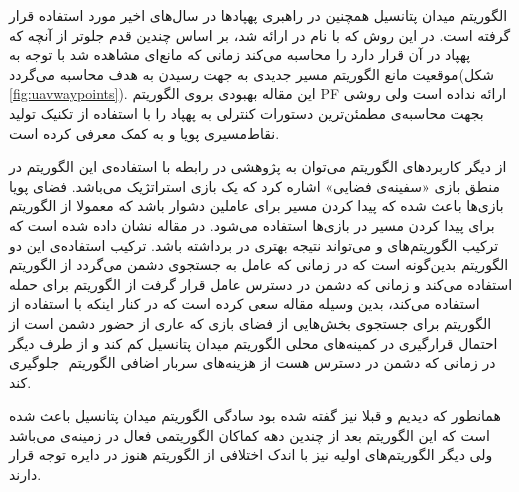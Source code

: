 الگوریتم میدان پتانسیل همچنین در راهبری پهپادها در سال‌های اخیر مورد استفاده قرار گرفته است. در این روش که با نام  در  ارائه شد، بر اساس  چندین قدم جلوتر از آنچه که پهپاد در آن قرار دارد را محاسبه می‌کند زمانی که مانع‌ای مشاهده شد با توجه به موقعیت مانع الگوریتم  مسیر جدیدی به جهت رسیدن به هدف محاسبه می‌گردد(شکل \ref{fig:uavwaypoints}). این مقاله بهبودی بروی الگوریتم PF ارائه نداده است ولی روشی بجهت محاسبه‌ی مطمئن‌ترین دستورات کنترلی به پهپاد را با استفاده از تکنیک تولید نقاط‌مسیری پویا و به کمک  معرفی کرده است.


از دیگر کاربردهای الگوریتم  می‌توان به پژوهشی در رابطه با استفاده‌ی این الگوریتم در منطق بازی «سفینه‌ی فضایی» اشاره کرد که یک بازی استراتژیک می‌باشد. فضای پویا بازی‌ها باعث شده که پیدا کردن مسیر برای عاملین دشوار باشد که معمولا از الگوریتم  برای پیدا کردن مسیر در بازی‌ها استفاده می‌شود. در مقاله نشان داده شده است که ترکیب الگوریتم‌های  و  می‌تواند نتیجه بهتری در برداشته باشد. ترکیب استفاده‌ی این دو الگوریتم بدین‌گونه است که در زمانی که عامل به جستجوی دشمن می‌گردد از الگوریتم  استفاده می‌کند و زمانی که دشمن در دسترس عامل قرار گرفت از الگوریتم  برای حمله استفاده می‌کند، بدین وسیله مقاله سعی کرده است که در کنار اینکه با استفاده از الگوریتم  برای جستجوی بخش‌هایی از فضای بازی که عاری از حضور دشمن است از احتمال قرارگیری در کمینه‌های محلی الگوریتم میدان پتانسیل کم کند و از طرف دیگر در زمانی که دشمن در دسترس هست از هزینه‌های سربار اضافی الگوریتم ‌‌ جلوگیری کند.

همانطور که دیدیم و قبلا نیز گفته شده بود سادگی الگوریتم میدان پتانسیل باعث شده است که این الگوریتم بعد از چندین دهه کماکان الگوریتمی فعال در زمینه‌ی  می‌باشد ولی دیگر الگوریتم‌های اولیه نیز با اندک اختلافی از الگوریتم  هنوز در دایره توجه قرار دارند.